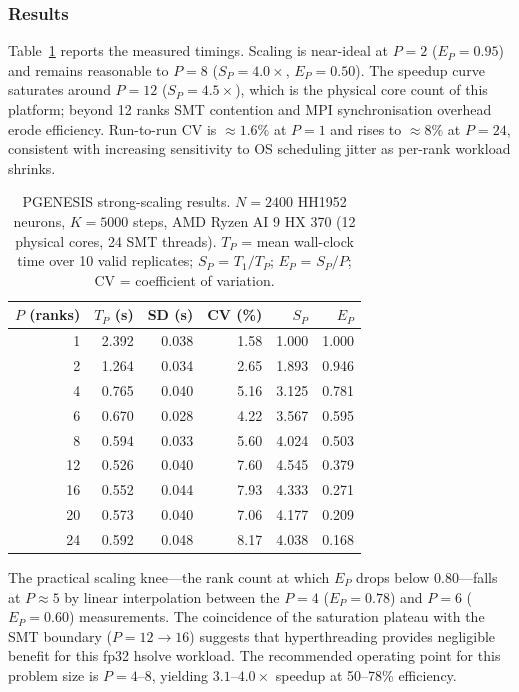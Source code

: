 \documentclass[11pt,a4paper]{article}
\begin{document}
\subsubsection*{Results}

Table~\ref{tab:mpi_scaling} reports the measured timings.
Scaling is near-ideal at $P = 2$ ($E_P = 0.95$) and remains reasonable to $P = 8$
($S_P = 4.0\times$, $E_P = 0.50$).
The speedup curve saturates around $P = 12$ ($S_P = 4.5\times$), which is the physical
core count of this platform; beyond 12 ranks SMT contention and MPI synchronisation
overhead erode efficiency.
Run-to-run CV is $\approx 1.6\%$ at $P = 1$ and rises to $\approx 8\%$ at $P = 24$,
consistent with increasing sensitivity to OS scheduling jitter as per-rank workload shrinks.

\begin{table}[H]
\centering
\caption{PGENESIS strong-scaling results.
$N = 2400$ HH1952 neurons, $K = 5000$ steps, AMD Ryzen AI 9 HX 370 (12 physical cores, 24 SMT threads).
$T_P$ = mean wall-clock time over 10 valid replicates;
$S_P$ = $T_1/T_P$; $E_P$ = $S_P/P$; CV = coefficient of variation.}
\label{tab:mpi_scaling}
\begin{tabular}{rrrrrr}
\toprule
$P$ (ranks) & $T_P$ (s) & SD (s) & CV (\%) & $S_P$ & $E_P$ \\
\midrule
1  & 2.392 & 0.038 & 1.58 & 1.000 & 1.000 \\
2  & 1.264 & 0.034 & 2.65 & 1.893 & 0.946 \\
4  & 0.765 & 0.040 & 5.16 & 3.125 & 0.781 \\
6  & 0.670 & 0.028 & 4.22 & 3.567 & 0.595 \\
8  & 0.594 & 0.033 & 5.60 & 4.024 & 0.503 \\
12 & 0.526 & 0.040 & 7.60 & 4.545 & 0.379 \\
16 & 0.552 & 0.044 & 7.93 & 4.333 & 0.271 \\
20 & 0.573 & 0.040 & 7.06 & 4.177 & 0.209 \\
24 & 0.592 & 0.048 & 8.17 & 4.038 & 0.168 \\
\bottomrule
\end{tabular}
\end{table}

The practical scaling knee---the rank count at which $E_P$ drops below $0.80$---falls
at $P \approx 5$ by linear interpolation between the $P = 4$ ($E_P = 0.78$) and $P = 6$
($E_P = 0.60$) measurements.
The coincidence of the saturation plateau with the SMT boundary ($P = 12 \to 16$)
suggests that hyperthreading provides negligible benefit for this fp32 hsolve workload.
The recommended operating point for this problem size is $P = 4$--$8$, yielding
$3.1$--$4.0\times$ speedup at 50--78\% efficiency.
\end{document}
